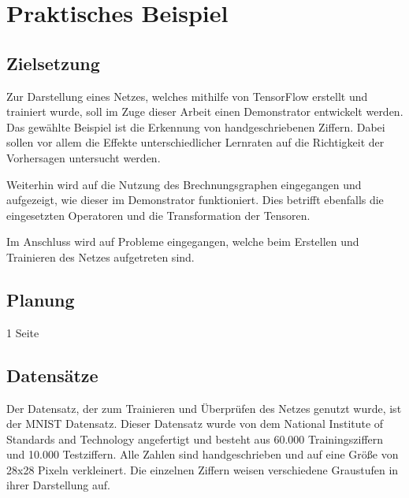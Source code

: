 \chapter{Praktisches Beispiel}
\label{chap:praktischesBeispiel}
\section{Zielsetzung}
\label{sec:zielsetzung}
\printsubchapterauthor{\authorMarco}
Zur Darstellung eines Netzes, welches mithilfe von TensorFlow erstellt und trainiert wurde, soll im Zuge dieser Arbeit einen Demonstrator entwickelt werden. Das gewählte Beispiel ist die Erkennung von handgeschriebenen Ziffern. Dabei sollen vor allem die Effekte unterschiedlicher Lernraten auf die Richtigkeit der Vorhersagen untersucht werden.

Weiterhin wird auf die Nutzung des Brechnungsgraphen eingegangen und aufgezeigt, wie dieser im Demonstrator funktioniert. Dies betrifft ebenfalls die eingesetzten Operatoren und die Transformation der Tensoren.

Im Anschluss wird auf Probleme eingegangen, welche beim Erstellen und Trainieren des Netzes aufgetreten sind.

\section{Planung}
\label{sec:planung}
\printsubchapterauthor{\authorNiklas}
1 Seite

\section{Datensätze}
\label{sec:datensaetze}
\printsubchapterauthor{\authorMarco}
Der Datensatz, der zum Trainieren und Überprüfen des Netzes genutzt wurde, ist der MNIST Datensatz. Dieser Datensatz wurde von dem National Institute of Standards and Technology angefertigt und besteht aus 60.000 Trainingsziffern und 10.000 Testziffern. Alle Zahlen sind handgeschrieben und auf eine Größe von 28x28 Pixeln verkleinert. Die einzelnen Ziffern weisen verschiedene Graustufen in ihrer Darstellung auf.

